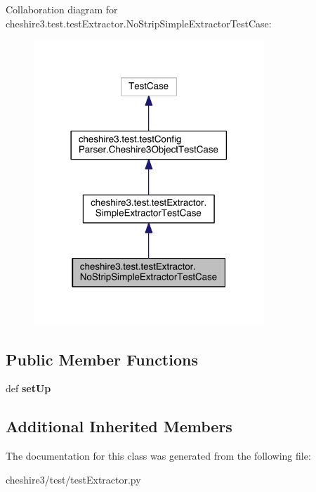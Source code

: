 Collaboration diagram for cheshire3.\-test.\-test\-Extractor.\-No\-Strip\-Simple\-Extractor\-Test\-Case\-:
\nopagebreak
\begin{figure}[H]
\begin{center}
\leavevmode
\includegraphics[width=246pt]{classcheshire3_1_1test_1_1test_extractor_1_1_no_strip_simple_extractor_test_case__coll__graph}
\end{center}
\end{figure}
\subsection*{Public Member Functions}
\begin{DoxyCompactItemize}
\item 
\hypertarget{classcheshire3_1_1test_1_1test_extractor_1_1_no_strip_simple_extractor_test_case_a5d6f8e4576a94e1383fd8155284d8736}{def {\bfseries set\-Up}}\label{classcheshire3_1_1test_1_1test_extractor_1_1_no_strip_simple_extractor_test_case_a5d6f8e4576a94e1383fd8155284d8736}

\end{DoxyCompactItemize}
\subsection*{Additional Inherited Members}


The documentation for this class was generated from the following file\-:\begin{DoxyCompactItemize}
\item 
cheshire3/test/test\-Extractor.\-py\end{DoxyCompactItemize}
